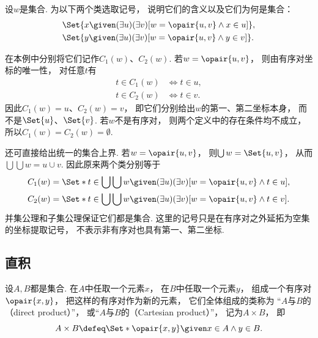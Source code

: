 \begin{example}
    设\(w\)是集合.
    为以下两个类选取记号，
    说明它们的含义以及它们为何是集合：
    \begin{align*}
        &\Set{x\given(\exists u)(\exists v)[w=\opair{u,v}\land x\in u]}, \\
        &\Set{y\given(\exists u)(\exists v)[w=\opair{u,v}\land y\in v]}.
    \end{align*}
    \begin{solution}
        在本例中分别将它们记作\(C_1(w)\)、\(C_2(w)\).
        若\(w=\opair{u,v}\)，
        则由有序对坐标的唯一性，
        对任意\(t\)有
        \begin{align*}
            t\in C_1(w)&\iff t\in u, \\
            t\in C_2(w)&\iff t\in v.
        \end{align*}
        因此\(C_1(w)=u\)、\(C_2(w)=v\)，
        即它们分别给出\(w\)的第一、第二坐标本身，
        而不是\(\Set{u}\)、\(\Set{v}\).
        若\(w\)不是有序对，
        则两个定义中的存在条件均不成立，
        所以\(C_1(w)=C_2(w)=\emptyset\).

        还可直接给出统一的集合上界.
        若\(w=\opair{u,v}\)，
        则\(\bigcup w=\Set{u,v}\)，
        从而\(\bigcup\bigcup w=u\cup v\).
        因此原来两个类分别等于
        \begin{align*}
            C_1(w)
            &=\Set*{t\in\bigcup\bigcup w
            \given(\exists u)(\exists v)[w=\opair{u,v}\land t\in u]}, \\
            C_2(w)
            &=\Set*{t\in\bigcup\bigcup w
            \given(\exists u)(\exists v)[w=\opair{u,v}\land t\in v]}.
        \end{align*}
        并集公理和子集公理保证它们都是集合.
        这里的记号只是在有序对之外延拓为空集的坐标提取记号，
        不表示非有序对也具有第一、第二坐标.
    \end{solution}
\end{example}

\subsection{直积}
\begin{definition}\label{definition:集合论.直积}
    设\(A,B\)都是集合.
    在\(A\)中任取一个元素\(x\)，
    在\(B\)中任取一个元素\(y\)，
    组成一个有序对\(\opair{x,y}\)，
    把这样的有序对作为新的元素，
    它们全体组成的类称为
    “\(A\)与\(B\)的（direct product）”，
    或“\(A\)与\(B\)的（Cartesian product）”，
    记为\(A \times B\)，
    即
    \begin{equation}
        A \times B
        \defeq
        \Set*{ \opair{x,y} \given x \in A \land y \in B }.
    \end{equation}
\end{definition}

